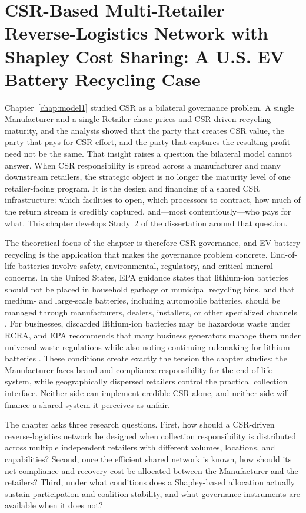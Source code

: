 \chapter{CSR-Based Multi-Retailer Reverse-Logistics Network with Shapley Cost Sharing: A U.S. EV Battery Recycling Case}
\label{chap:model2}

Chapter~\ref{chap:model1} studied CSR as a bilateral governance problem. A single Manufacturer and a single Retailer chose prices and CSR-driven recycling maturity, and the analysis showed that the party that creates CSR value, the party that pays for CSR effort, and the party that captures the resulting profit need not be the same. That insight raises a question the bilateral model cannot answer. When CSR responsibility is spread across a manufacturer and many downstream retailers, the strategic object is no longer the maturity level of one retailer-facing program. It is the design and financing of a shared CSR infrastructure: which facilities to open, which processors to contract, how much of the return stream is credibly captured, and---most contentiously---who pays for what. This chapter develops Study~2 of the dissertation around that question.

The theoretical focus of the chapter is therefore CSR governance, and EV battery recycling is the application that makes the governance problem concrete. End-of-life batteries involve safety, environmental, regulatory, and critical-mineral concerns. In the United States, EPA guidance states that lithium-ion batteries should not be placed in household garbage or municipal recycling bins, and that medium- and large-scale batteries, including automobile batteries, should be managed through manufacturers, dealers, installers, or other specialized channels \cite{EPA2026UsedLithiumIon}. For businesses, discarded lithium-ion batteries may be hazardous waste under RCRA, and EPA recommends that many business generators manage them under universal-waste regulations while also noting continuing rulemaking for lithium batteries \cite{EPA2026UniversalWaste}. These conditions create exactly the tension the chapter studies: the Manufacturer faces brand and compliance responsibility for the end-of-life system, while geographically dispersed retailers control the practical collection interface. Neither side can implement credible CSR alone, and neither side will finance a shared system it perceives as unfair.

The chapter asks three research questions. First, how should a CSR-driven reverse-logistics network be designed when collection responsibility is distributed across multiple independent retailers with different volumes, locations, and capabilities? Second, once the efficient shared network is known, how should its net compliance and recovery cost be allocated between the Manufacturer and the retailers? Third, under what conditions does a Shapley-based allocation actually sustain participation and coalition stability, and what governance instruments are available when it does not?

